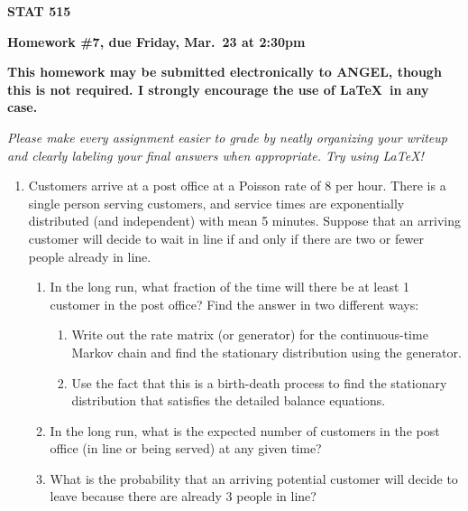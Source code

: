 \documentclass{article}
\begin{document}
\begin{center}
{\bf STAT 515}

{\bf Homework \#7, due Friday, Mar.~23 at 2:30pm}

{\bf This homework may be submitted electronically to ANGEL, though this
is not required.  I strongly encourage the use of \LaTeX\ in any case.}

\end{center}

{\it Please make every assignment easier to grade by neatly organizing your
writeup and clearly labeling your final answers when appropriate. Try using
\LaTeX!}


\begin{enumerate}

  \item Customers arrive at a post office at a Poisson rate of 8 per hour. There
  is a single person serving customers, and service times are exponentially
  distributed (and independent) with mean 5 minutes. Suppose that an arriving
  customer will decide to wait in line if and only if there are two or fewer
  people already in line.
  
    \begin{enumerate}

    \item In the long run, what fraction of the time will there be at least 1
    customer in the post office? Find the answer in two different ways:

      \begin{enumerate}
      
      \item Write out the rate matrix (or generator) for the continuous-time
      Markov chain and find the stationary distribution using the generator.
      
      \item Use the fact that this is a birth-death process to find the
      stationary distribution that satisfies the detailed balance equations.
      
      \end{enumerate}
      
    \item In the long run, what is the expected number of customers in the post
    office (in line or being served) at any given time?
    
    \item What is the probability that an arriving potential customer will
    decide to leave because there are already 3 people in line?
    

\end{enumerate}
\end{enumerate}
\end{document}
